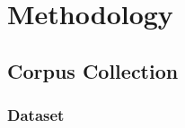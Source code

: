 \documentclass[12pt]{book} %
\begin{document}





    

\chapter{Methodology}

\section{Corpus Collection}

\subsection{Dataset}
\end{document}
